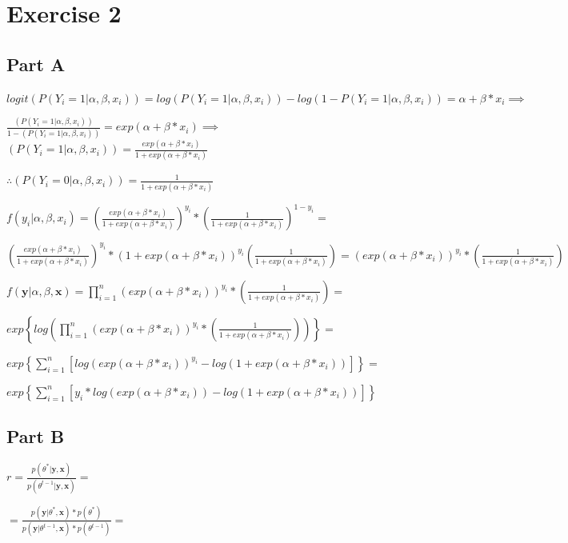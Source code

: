 \documentclass{article}\usepackage[]{graphicx}\usepackage[]{color}
\begin{document}
\section*{Exercise 2}
\subsection*{Part A}
$logit(P(Y_{i}=1|\alpha,\beta,x_{i}))=log(P(Y_{i}=1|\alpha,\beta,x_{i}))-log(1-P(Y_{i}=1|\alpha,\beta,x_{i}))=\alpha+\beta*x_{i}\implies$

$\frac{(P(Y_{i}=1|\alpha,\beta,x_{i}))}{1-(P(Y_{i}=1|\alpha,\beta,x_{i}))}=exp(\alpha+\beta*x_{i})\implies$
$(P(Y_{i}=1|\alpha,\beta,x_{i}))=\frac{exp(\alpha+\beta*x_{i})}{1+exp(\alpha+\beta*x_{i})}$

$\therefore (P(Y_{i}=0|\alpha,\beta,x_{i})) = \frac{1}{1+exp(\alpha+\beta*x_{i})}$

$f(y_{i}|\alpha,\beta,x_{i})=\left(\frac{exp(\alpha+\beta*x_{i})}{1+exp(\alpha+\beta*x_{i})}\right)^{y_{i}}*\left(\frac{1}{1+exp(\alpha+\beta*x_{i})}\right)^{1-y_{i}}=$

$\left(\frac{exp(\alpha+\beta*x_{i})}{1+exp(\alpha+\beta*x_{i})}\right)^{y_{i}}*\left(1+exp(\alpha+\beta*x_{i})\right)^{y_{i}}\left(\frac{1}{1+exp(\alpha+\beta*x_{i})}\right)=\left(exp(\alpha+\beta*x_{i})\right)^{y_{i}}*\left(\frac{1}{1+exp(\alpha+\beta*x_{i})}\right)$

$\ensuremath{f(\boldsymbol{y}|\alpha,\beta,\boldsymbol{x})=\prod_{i=1}^{n}\left(exp(\alpha+\beta*x_{i})\right)^{y_{i}}*\left(\frac{1}{1+exp(\alpha+\beta*x_{i})}\right)=}$

$exp\left\{ log\left(\prod_{i=1}^{n}\left(exp(\alpha+\beta*x_{i})\right)^{y_{i}}*\left(\frac{1}{1+exp(\alpha+\beta*x_{i})}\right)\right)\right\} =$

$exp\left\{ \sum_{i=1}^{n}\left[log\left(exp(\alpha+\beta*x_{i})\right)^{y_{i}}-log\left(1+exp(\alpha+\beta*x_{i})\right)\right]\right\} =$

$exp\left\{ \sum_{i=1}^{n}\left[y_{i}*log\left(exp(\alpha+\beta*x_{i})\right)-log\left(1+exp(\alpha+\beta*x_{i})\right)\right]\right\}$
\subsection*{Part B}
$r=\frac{p(\theta^{*}|\boldsymbol{y},\boldsymbol{x})}{{p(\theta^{t-1}|\boldsymbol{y},\boldsymbol{x})}}=$

$=\frac{p(\boldsymbol{y}|\theta^{*},\boldsymbol{x})*p(\theta^{*})}{p(\boldsymbol{y}|\theta^{t-1},\boldsymbol{x})*p(\theta^{t-1})}=$
\end{document}
